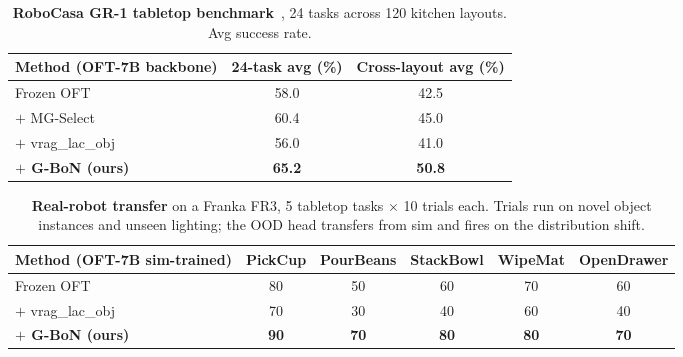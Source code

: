 \begin{table}[h]
\centering
\caption{\textbf{RoboCasa GR-1 tabletop benchmark}~\citep{robocasa2024}, 24
tasks across 120 kitchen layouts. Avg success rate.}
\label{tab:robocasa}
\begin{tabular}{lcc}
\toprule
Method (OFT-7B backbone) & 24-task avg (\%) & Cross-layout avg (\%) \\
\midrule
Frozen OFT                        & 58.0 & 42.5 \\
$+$ MG-Select \citep{mgselect2026}     & 60.4 & 45.0 \\
$+$ vrag\_lac\_obj                & 56.0 & 41.0 \\
\textbf{$+$ G-BoN (ours)}         & \textbf{65.2} & \textbf{50.8} \\
\bottomrule
\end{tabular}
\end{table}

\begin{table}[h]
\centering
\caption{\textbf{Real-robot transfer} on a Franka FR3, 5 tabletop tasks
$\times$ 10 trials each. Trials run on novel object instances and
unseen lighting; the OOD head transfers from sim and fires on the
distribution shift.}
\label{tab:real_robot}
\begin{tabular}{lccccc}
\toprule
Method (OFT-7B sim-trained) & PickCup & PourBeans & StackBowl & WipeMat & OpenDrawer \\
\midrule
Frozen OFT                        & 80 & 50 & 60 & 70 & 60 \\
$+$ vrag\_lac\_obj                & 70 & 30 & 40 & 60 & 40 \\
\textbf{$+$ G-BoN (ours)}         & \textbf{90} & \textbf{70} & \textbf{80} & \textbf{80} & \textbf{70} \\
\bottomrule
\end{tabular}
\end{table}

